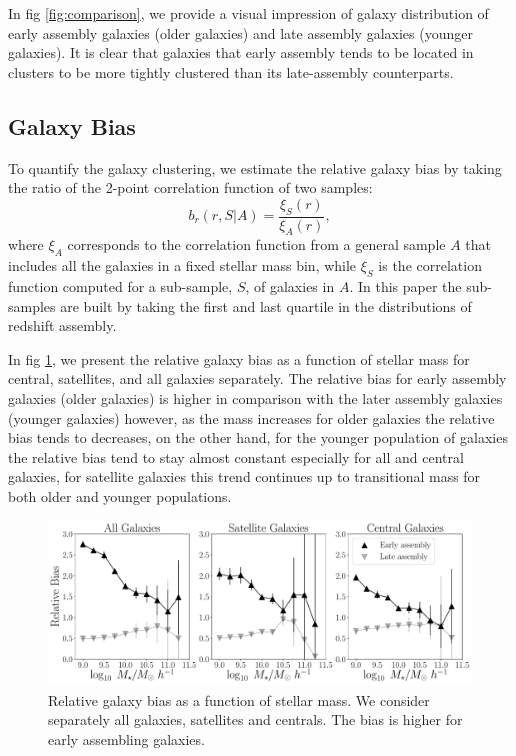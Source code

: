 \documentclass[a4paper,fleqn,usenatbib]{mnras}
\begin{document}
In fig \ref{fig:comparison}, we provide a visual impression of galaxy
distribution of early assembly galaxies (older galaxies) and late
assembly galaxies (younger galaxies). It is clear that galaxies that
early assembly tends to be located in clusters to be more tightly
clustered than its late-assembly counterparts. 



\subsection{Galaxy Bias}
To quantify the galaxy clustering, we estimate the relative galaxy
bias by taking the ratio of the 2-point correlation function of two
samples: 
%
\begin{equation}
b_r(r, S|A)= \frac{\xi_S(r)}{\xi_A(r)}, 
\label{eq:relative}
\end{equation}
%
where $\xi_A$ corresponds to the correlation function from a general
sample $A$ that includes all the galaxies in a fixed stellar mass bin,
while $\xi_S$ is the correlation function computed for a sub-sample,
$S$, of galaxies in $A$. In this paper the sub-samples are built by
taking the first and last quartile in the distributions of redshift
assembly. 

In fig \ref{fig:galaxy_bias}, we present the relative galaxy bias as a
function of stellar mass for central, satellites, and all galaxies
separately. The relative bias for early assembly galaxies (older
galaxies) is higher in comparison with the later assembly galaxies
(younger galaxies) however, as the mass increases for older galaxies
the relative bias tends to decreases, on the other hand, for the
younger population of galaxies the relative bias tend to stay almost
constant especially for all and central galaxies, for satellite
galaxies this trend continues up to transitional mass for both older
and younger populations. 

\begin{figure}
    \centering
    \includegraphics[width=2.0\columnwidth]{figuras/bias_galaxies.pdf}
    \caption{Relative galaxy bias as a function of stellar mass.
    We consider separately all galaxies, satellites and centrals.
    The bias is higher for early assembling galaxies.}
    \label{fig:galaxy_bias}
\end{figure}
\end{document}
